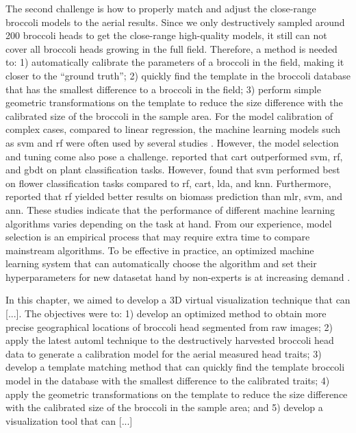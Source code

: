 The second challenge is how to properly match and adjust the close-range broccoli models to the aerial results. Since we only destructively sampled around 200 broccoli heads to get the close-range high-quality models, it still can not cover all broccoli heads growing in the full field. Therefore, a method is needed to: 1) automatically calibrate the parameters of a broccoli in the field, making it closer to the ``ground truth''; 2) quickly find the template in the broccoli database that has the smallest difference to a broccoli in the field; 3) perform simple geometric transformations on the template to reduce the size difference with the calibrated size of the broccoli in the sample area. For the model calibration of complex cases, compared to linear regression, the machine learning models such as \gls{svm} and \gls{rf} were often used by several studies \citep{nguyen_uav_2023, lu_assessment_2022}. However, the model selection and tuning come also pose a challenge. \citet{wang_landscape_2019} reported that \gls{cart} outperformed \gls{svm}, \gls{rf}, and \gls{gbdt} on plant classification tasks. However, \citet{han_drone_2021} found that \gls{svm} performed best on flower classification tasks compared to \gls{rf}, \gls{cart}, \gls{lda}, and \gls{knn}. Furthermore, \citet{han_modeling_2019} reported that \gls{rf} yielded better results on biomass prediction than \gls{mlr}, \gls{svm}, and \gls{ann}. These studies indicate that the performance of different machine learning algorithms varies depending on the task at hand. From our experience, model selection is an empirical process that may require extra time to compare mainstream algorithms. To be effective in practice, an optimized machine learning system that can automatically choose the algorithm and set their hyperparameters for new datasetat hand by non-experts is at increasing demand \citep{feurer_efficient_2015}.

In this chapter, we aimed to develop a 3D virtual visualization technique that can [...]. The objectives were to: 1) develop an optimized method to obtain more precise geographical locations of broccoli head segmented from raw images; 2) apply the latest \gls{automl} technique to the destructively harvested broccoli head data to generate a calibration model for the aerial measured head traits; 3) develop a template matching method that can quickly find the template broccoli model in the database with the smallest difference to the calibrated traits; 4) apply the geometric transformations on the template to reduce the size difference with the calibrated size of the broccoli in the sample area; and 5) develop a visualization tool that can [...]

